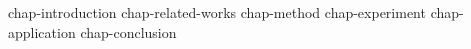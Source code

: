 % 
% 
% 
% 
% 
% 
% 

{chap-introduction}
{chap-related-works}
{chap-method}
{chap-experiment}
{chap-application}
{chap-conclusion}

% 
% 
% 
% 
% 
% 
